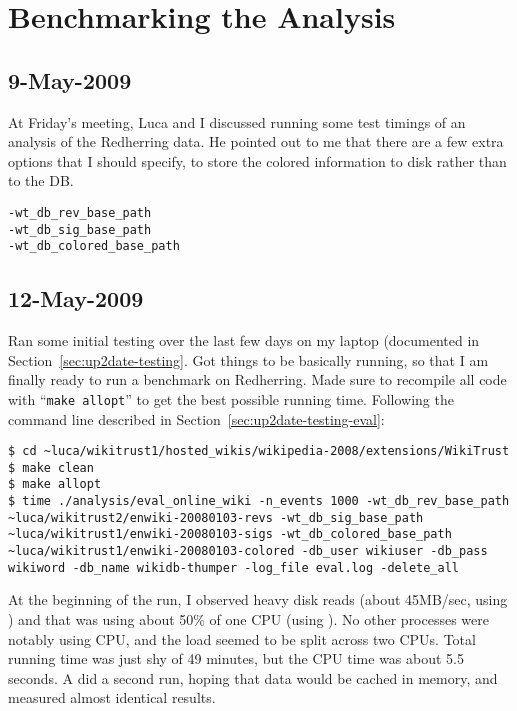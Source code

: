 \section{Benchmarking the Analysis}

\subsection{9-May-2009}

At Friday's meeting, Luca and I discussed running some test timings
of an analysis of the Redherring data.
He pointed out to me that there are a few extra options that
I should specify, to store the colored information to disk
rather than to the DB.
\begin{verbatim}
-wt_db_rev_base_path
-wt_db_sig_base_path
-wt_db_colored_base_path
\end{verbatim}

\subsection{12-May-2009}

Ran some initial testing over the last few days on my
laptop (documented in Section~\ref{sec:up2date-testing}.
Got things to be basically running, so that I am finally
ready to run a benchmark on Redherring.
Made sure to recompile all code with ``\texttt{make allopt}''
to get the  best possible running time.
Following the command line described in
Section~\ref{sec:up2date-testing-eval}:
\begin{verbatim}
$ cd ~luca/wikitrust1/hosted_wikis/wikipedia-2008/extensions/WikiTrust
$ make clean
$ make allopt
$ time ./analysis/eval_online_wiki -n_events 1000 -wt_db_rev_base_path ~luca/wikitrust2/enwiki-20080103-revs -wt_db_sig_base_path ~luca/wikitrust1/enwiki-20080103-sigs -wt_db_colored_base_path ~luca/wikitrust1/enwiki-20080103-colored -db_user wikiuser -db_pass wikiword -db_name wikidb-thumper -log_file eval.log -delete_all
\end{verbatim}
At the beginning of the run, I observed heavy disk reads (about 45MB/sec,
using )
and that  was using about 50\% of one CPU (using ).
No other processes were notably using CPU, and the 
load seemed to be split across two CPUs.
Total running time was just shy of 49 minutes,
but the CPU time was about 5.5 seconds.
A did a second run, hoping that data would be cached in memory,
and measured almost identical results.

